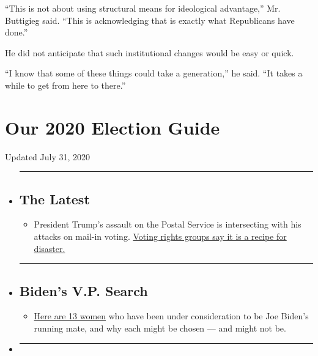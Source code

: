 ``This is not about using structural means for ideological advantage,''
Mr. Buttigieg said. ``This is acknowledging that is exactly what
Republicans have done.''

He did not anticipate that such institutional changes would be easy or
quick.

``I know that some of these things could take a generation,'' he said.
``It takes a while to get from here to there.''

\hypertarget{our-2020-election-guide}{%
\section{Our 2020 Election Guide}\label{our-2020-election-guide}}

Updated July 31, 2020

\begin{itemize}
\item
  \begin{center}\rule{0.5\linewidth}{\linethickness}\end{center}

  \hypertarget{the-latest}{%
  \subsection{The Latest}\label{the-latest}}

  \begin{itemize}
  \tightlist
  \item
    President Trump's assault on the Postal Service is intersecting with
    his attacks on mail-in voting.
    \href{https://www.nytimes.com/2020/07/31/us/politics/trump-usps-mail-delays.html?action=click\&pgtype=Article\&state=default\&region=BELOW_MAIN_CONTENT\&context=storylines_guide}{Voting
    rights groups say it is a recipe for disaster.}
  \end{itemize}
\item
  \begin{center}\rule{0.5\linewidth}{\linethickness}\end{center}

  \hypertarget{bidens-vp-search}{%
  \subsection{Biden's V.P. Search}\label{bidens-vp-search}}

  \begin{itemize}
  \tightlist
  \item
    \href{https://www.nytimes.com/article/biden-vice-president-2020.html?action=click\&pgtype=Article\&state=default\&region=BELOW_MAIN_CONTENT\&context=storylines_guide}{Here
    are 13 women} who have been under consideration to be Joe Biden's
    running mate, and why each might be chosen --- and might not be.
  \end{itemize}
\item
  \begin{center}\rule{0.5\linewidth}{\linethickness}\end{center}


\end{itemize}
